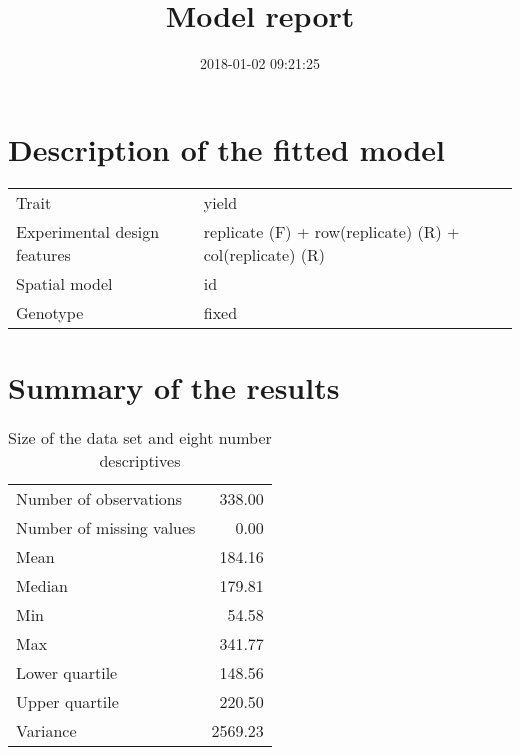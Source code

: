 \documentclass[a4paper,11pt]{article}\usepackage[]{graphicx}\usepackage[]{color}
\title{Model report}%
\author{\vspace{-5ex}}
\date{2018-01-02 09:21:25}
\begin{document}



\maketitle

\singlespacing

\section{Description of the fitted model}

\begin{table}[ht]
\begin{flushleft}
\begin{tabular}{ll}
  Trait & yield \\ 
  Experimental design features & replicate (F) + row(replicate) (R) + col(replicate) (R) \\ 
  Spatial model & id \\ 
  Genotype & fixed \\ 
  \end{tabular}
\label{modelDescription}
\end{flushleft}
\end{table}


\section{Summary of the results}

\begin{table}[ht]
\begin{flushleft}
\caption{Size of the data set and eight number descriptives} 
\label{modelSummary}
\begin{tabular}{lr}
  \hline
  \hline
Number of observations & 338.00 \\ 
  Number of missing values & 0.00 \\ 
  Mean & 184.16 \\ 
  Median & 179.81 \\ 
  Min & 54.58 \\ 
  Max & 341.77 \\ 
  Lower quartile & 148.56 \\ 
  Upper quartile & 220.50 \\ 
  Variance & 2569.23 \\ 
   \hline
\end{tabular}
\end{flushleft}
\end{table}
\end{document}
